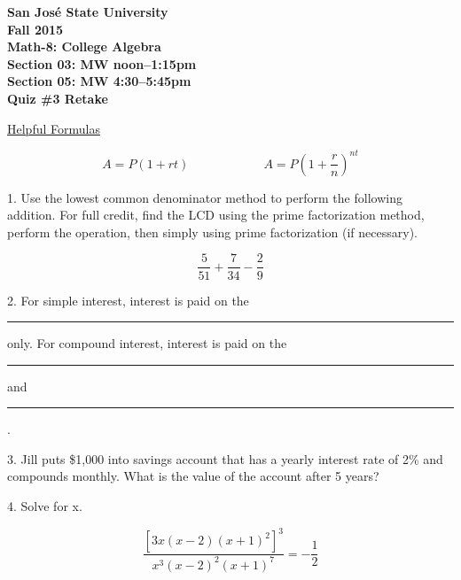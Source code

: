 \documentclass[letterpaper, 12pt]{article}
\begin{document}
\begin{center}
\bfseries
San Jos\'{e} State University \\
Fall 2015 \\
Math-8: College Algebra \\
Section 03: MW noon--1:15pm \\
Section 05: MW 4:30--5:45pm \\
\bigskip
Quiz \#3 Retake
\end{center}

\bigskip

\newcommand{\fillin}{\rule{1in}{1pt}}

\underline{Helpful Formulas}

\[A=P\left(1+rt\right)\hspace{1in}A=P\left(1+\frac{r}{n}\right)^{nt}\]

\bigskip

1. Use the lowest common denominator method to perform the following addition.
For full credit, find the LCD using the prime factorization method, perform
the operation, then simply using prime factorization (if necessary).

\[\frac{5}{51}+\frac{7}{34}-\frac{2}{9}\]

\vspace{3in}

2. For simple interest, interest is paid on the \fillin only.  For compound
interest, interest is paid on the \fillin and \fillin.

\newpage

3. Jill puts \$1,000 into savings account that has a yearly interest rate of
2\% and compounds monthly.  What is the value of the account after 5 years?

\vspace{3in}

4. Solve for x.

\[\frac{\left[3x\left(x-2\right)\left(x+1\right)^2\right]^3}{x^3(x-2)^2(x+1)^7}=-\frac{1}{2}\]
\end{document}
